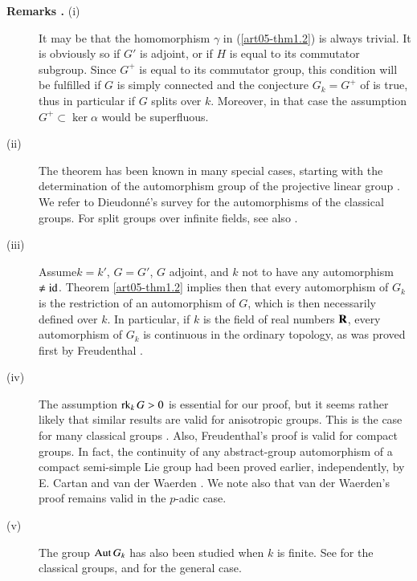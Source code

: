 \begin{description}
\item[{\bf Remarks .\label{art05-rem1.4}} {\rm(i)}] It may be that the homomorphism $\gamma$ in (\ref{art05-thm1.2}) is always trivial. It is obviously so if $G'$ is adjoint, or if $H$ is equal to its commutator subgroup. Since $G^{+}$ is equal to its commutator group, this condition will be fulfilled if $G$ is simply connected and the conjecture $G_{k}=G^{+}$ of \cite{art05-key10} is true, thus in particular if $G$ splits over $k$. Moreover, in that case the assumption $G^{+}\subset \ker \alpha$ would be superfluous.

\item[{\rm(ii)}] The theorem has been known in many special cases, starting with the determination of the automorphism group of the projective linear group \cite{art05-key7}. We refer to Dieudonn\'e's survey \cite{art05-key4} for the automorphisms of the classical groups. For split groups over infinite fields, see also \cite{art05-key6}.

\item[{\rm(iii)}] Assume\pageoriginale $k=k'$, $G=G'$, $G$ adjoint, and $k$ not to have any automorphism $\neq \operatorname{\mathrm{id}}$. Theorem \ref{art05-thm1.2} implies then that every automorphism of $G_{k}$ is the restriction of an automorphism of $G$, which is then necessarily defined over $k$. In particular, if $k$ is the field of real numbers $\mathbf{R}$, every automorphism of $G_{k}$ is continuous in the ordinary topology, as was proved first by Freudenthal \cite{art05-key5}.

\item[{\rm(iv)}] The assumption $\operatorname{\mathrm{rk}}_{k}G>0$ is essential for our proof, but it seems rather likely that similar results are valid for anisotropic groups. This is the case for many classical groups \cite{art05-key4}. Also, Freudenthal's proof is valid for compact groups. In fact, the continuity of any abstract-group automorphism of a compact semi-simple Lie group had been proved earlier, independently, by E. Cartan \cite{art05-key2} and van der Waerden \cite{art05-key11}. We note also that van der Waerden's proof remains valid in the $p$-adic case.

\item[{\rm(v)}] The group $\operatorname{\mathrm{Aut}} G_{k}$ has also been studied when $k$ is finite. See \cite{art05-key4} for the classical groups, and \cite{art05-key8} for the general case.
\end{description}

